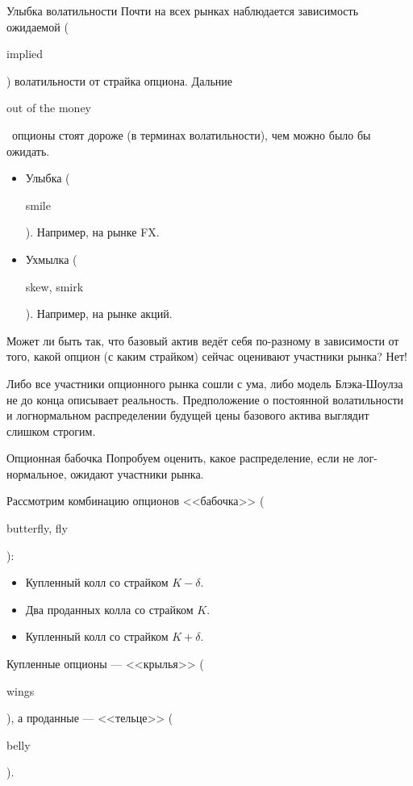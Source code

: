 \documentclass{beamer}
\newcommand{\en}[1]{\begin{otherlanguage}{english}#1\end{otherlanguage}}
\begin{document}
\begin{frame}{Улыбка волатильности}
\justify
Почти на всех рынках наблюдается зависимость ожидаемой (\en{implied}) волатильности от страйка опциона. Дальние \en{out of the money}\ опционы стоят дороже (в терминах волатильности), чем можно было бы ожидать.
\begin{itemize}
\item Улыбка (\en{smile}). Например, на рынке FX.
\item Ухмылка (\en{skew, smirk}). Например, на рынке акций.
\end{itemize}

\justify
Может ли быть так, что базовый актив ведёт себя по-разному в зависимости от того, какой опцион (с каким страйком) сейчас оценивают участники рынка? Нет!

\justify
Либо все участники опционного рынка сошли с ума, либо модель Блэка-Шоулза не до конца описывает реальность. Предположение о постоянной волатильности и логнормальном распределении будущей цены базового актива выглядит слишком строгим.
\end{frame}



\begin{frame}{Опционная бабочка}
\justify
Попробуем оценить, какое распределение, если не лог-нормальное, ожидают участники рынка.

\justify
Рассмотрим комбинацию опционов <<бабочка>> (\en{butterfly, fly}):
\begin{itemize}
\item Купленный колл со страйком $K - \delta$.
\item Два проданных колла со страйком $K$.
\item Купленный колл со страйком $K + \delta$.
\end{itemize}

\justify
Купленные опционы --- <<крылья>> (\en{wings}), а проданные --- <<тельце>> (\en{belly}).
\end{frame}
\end{document}
